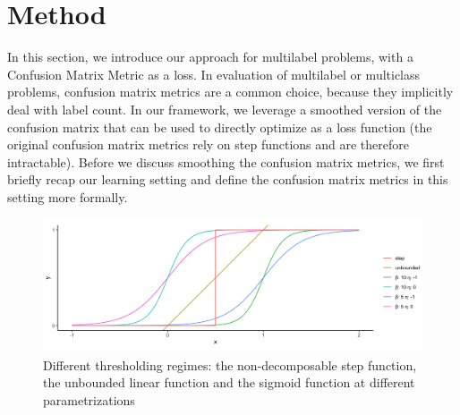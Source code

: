 
\section{Method}
\label{sec:orga8a42f5}
\label{section:method}

In this section, we introduce our approach for multilabel problems, with a Confusion Matrix Metric as a loss. In evaluation of multilabel or multiclass problems, confusion matrix metrics are a common choice, because they implicitly deal with label count. In our framework, we leverage a smoothed version of the confusion matrix that can be used to directly optimize as a loss function (the original confusion matrix metrics rely on step functions and are therefore intractable). Before we discuss smoothing the confusion matrix metrics, we first briefly recap our learning setting and define the confusion matrix metrics in this setting more formally.

\begin{figure}[htbp]
\centering
\includegraphics[width=.95\linewidth]{./images/sigmoid.png}
\caption{\label{fig:sigmoid}
Different thresholding regimes: the non-decomposable step function, the unbounded linear function and the sigmoid function at different parametrizations}
\end{figure}





